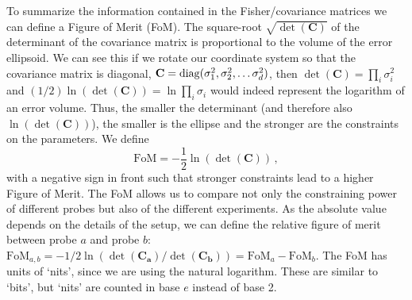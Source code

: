 To summarize the information contained in the Fisher/covariance matrices we can
define a Figure of Merit (FoM).
The square-root $\sqrt{\det(\mathbf{C})}$ of the determinant of the covariance matrix is proportional to the volume of the error
ellipsoid. We can see this if we rotate our coordinate system so that the 
covariance matrix is diagonal, $\mathbf C = {\rm diag}(\sigma_1^2, \sigma_2^2, \ldots \sigma_{d}^{2})$, then $\det(\mathbf C) = \prod_i \sigma_i^2$ and $(1/2)\ln(\det(\mathbf C)) = \ln \prod_i\sigma_i$ would indeed represent the logarithm of an error volume. Thus, the smaller the determinant (and therefore also $\ln(\det(\mathbf{C}))$), the smaller is the ellipse and the stronger are the constraints on the parameters. We define
\begin{equation}\label{eq:FoM}
\mathrm{FoM} = -\frac{1}{2} \ln(\det(\mathbf{C})) \, ,
\end{equation}
with a negative sign in front such that stronger constraints lead to a higher Figure of Merit. 
The FoM allows us to compare not only the constraining power of different probes but also of the different experiments. 
As the absolute value depends on the details of the setup, 
we can define the relative figure of merit between probe $a$ and probe $b$: $\mathrm{FoM}_{a,b} = -1/2 \ln(\det(\mathbf{C_a})/\det(\mathbf{C_b})) = \mathrm{FoM}_{a}-\mathrm{FoM}_{b}$.
The FoM has units of `nits', since we are using the natural logarithm. 
These are similar to `bits', but `nits' are counted in base $e$ instead of base 2.

